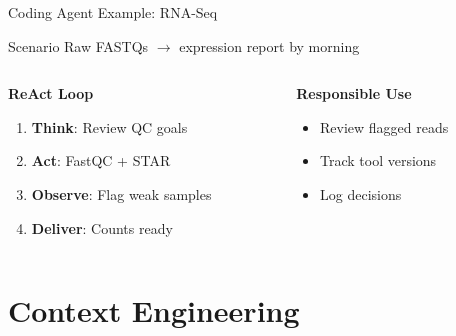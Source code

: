 \documentclass[aspectratio=169]{beamer}
\begin{document}
\begin{frame}{Coding Agent Example: RNA-Seq}
  \begin{block}{Scenario}
    Raw FASTQs $\rightarrow$ expression report by morning
  \end{block}

  \vspace{0.5cm}

  \begin{columns}[T]
    \begin{column}{0.48\textwidth}
      \centering
      \large\bfseries
      \textcolor{conesaTeal}{ReAct Loop}

      \vspace{0.3cm}
      \normalsize

      \begin{enumerate}
        \item \textbf{Think}: Review QC goals
        \item \textbf{Act}: FastQC + STAR
        \item \textbf{Observe}: Flag weak samples
        \item \textbf{Deliver}: Counts ready
      \end{enumerate}
    \end{column}
    \begin{column}{0.48\textwidth}
      \centering
      \large\bfseries
      \textcolor{conesaOrange}{Responsible Use}

      \vspace{0.3cm}
      \normalsize

      \begin{itemize}
        \item Review flagged reads
        \item Track tool versions
        \item Log decisions
      \end{itemize}
    \end{column}
  \end{columns}
\end{frame}

\section{Context Engineering}
\end{document}
